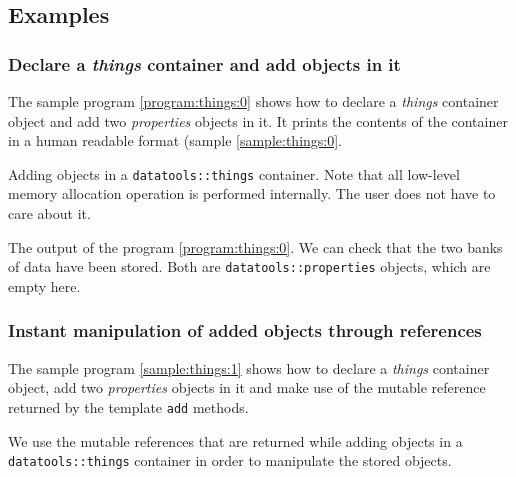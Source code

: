 
\subsection{Examples}

\subsubsection{Declare a \emph{things} container and add objects in it}

\pn  The sample program \ref{program:things:0}  shows how  to
declare a \emph{things} container object and add two \emph{properties}
objects in  it. It  prints the  contents of the  container in  a human
readable format (sample \ref{sample:things:0}.

\begin{program}[h]
\caption{Adding     objects     in    a     \texttt{datatools::things}
  container. Note  that all  low-level memory allocation  operation is
  performed internally. The user does not have to care about it.  }
\label{program:things:0}
\end{program}



\begin{sample}[h]
\caption{The  output of  the program  \ref{program:things:0}.   We can
  check  that  the  two banks  of  data  have  been stored.  Both  are
  \texttt{datatools::properties} objects, which are empty here.  }
\label{sample:things:0}
\end{sample}


\subsubsection{Instant manipulation of added objects through references}

\pn  The sample program  \ref{sample:things:1}  shows how  to
declare  a \emph{things} container  object, add  two \emph{properties}
objects in  it and make use  of the mutable reference  returned by the
template \texttt{add} methods.

\begin{sample}[h]
\caption{We use the mutable  references that are returned while adding
  objects  in  a  \texttt{datatools::things}  container  in  order  to
  manipulate the stored objects.  }
\label{sample:things:1}
\end{sample}


